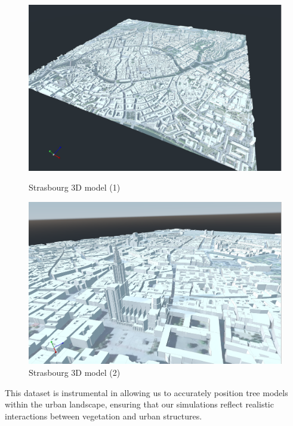 \documentclass[12pt]{article}
\begin{document}
\begin{figure}[H]
    \centering
    \begin{minipage}{0.45\textwidth}
        \centering
        \includegraphics[width=1\textwidth]{images/strasbourg-mesh-1.png}
        \caption{Strasbourg 3D model (1)}
    \end{minipage}
    \begin{minipage}{0.45\textwidth}
        \centering
        \includegraphics[width=1\textwidth]{images/strasbourg-mesh-2.png}
        \caption{Strasbourg 3D model (2)}
    \end{minipage}
\end{figure}

This dataset is instrumental in allowing us to accurately position tree models
within the urban landscape, ensuring that our simulations reflect realistic
interactions between vegetation and urban structures.
\end{document}
